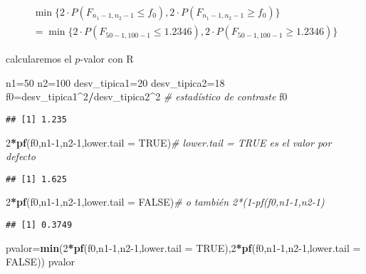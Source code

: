 \documentclass[
]{article}
\newenvironment{Shaded}{\begin{snugshade}}{\end{snugshade}}
\newcommand{\CommentTok}[1]{\textcolor[rgb]{0.56,0.35,0.01}{\textit{#1}}}
\newcommand{\DataTypeTok}[1]{\textcolor[rgb]{0.13,0.29,0.53}{#1}}
\newcommand{\DecValTok}[1]{\textcolor[rgb]{0.00,0.00,0.81}{#1}}
\newcommand{\KeywordTok}[1]{\textcolor[rgb]{0.13,0.29,0.53}{\textbf{#1}}}
\newcommand{\NormalTok}[1]{#1}
\newcommand{\OperatorTok}[1]{\textcolor[rgb]{0.81,0.36,0.00}{\textbf{#1}}}
\newcommand{\OtherTok}[1]{\textcolor[rgb]{0.56,0.35,0.01}{#1}}
\begin{document}
\[
\begin{array}{l}
\min\{2\cdot P(F_{n_1-1,n_2-1}\leq f_0),2\cdot P(F_{n_1-1,n_2-1}\geq f_0)\}\\=\min\{2\cdot P(F_{50-1,100-1}\leq 1.2346),2\cdot P(F_{50-1,100-1}\geq 1.2346)\}
\end{array}
\]

calcularemos el \(p\)-valor con R

\begin{Shaded}
\begin{Highlighting}[]
\NormalTok{n1=}\DecValTok{50}
\NormalTok{n2=}\DecValTok{100}
\NormalTok{desv\_tipica1=}\DecValTok{20}
\NormalTok{desv\_tipica2=}\DecValTok{18}
\NormalTok{f0=desv\_tipica1}\OperatorTok{\^{}}\DecValTok{2}\OperatorTok{/}\NormalTok{desv\_tipica2}\OperatorTok{\^{}}\DecValTok{2} \CommentTok{\# estadístico de contraste}
\NormalTok{f0}
\end{Highlighting}
\end{Shaded}

\begin{verbatim}
## [1] 1.235
\end{verbatim}

\begin{Shaded}
\begin{Highlighting}[]
\DecValTok{2}\OperatorTok{*}\KeywordTok{pf}\NormalTok{(f0,n1}\DecValTok{{-}1}\NormalTok{,n2}\DecValTok{{-}1}\NormalTok{,}\DataTypeTok{lower.tail =} \OtherTok{TRUE}\NormalTok{)}\CommentTok{\# lower.tail = TRUE es el valor por defecto }
\end{Highlighting}
\end{Shaded}

\begin{verbatim}
## [1] 1.625
\end{verbatim}

\begin{Shaded}
\begin{Highlighting}[]
\DecValTok{2}\OperatorTok{*}\KeywordTok{pf}\NormalTok{(f0,n1}\DecValTok{{-}1}\NormalTok{,n2}\DecValTok{{-}1}\NormalTok{,}\DataTypeTok{lower.tail =} \OtherTok{FALSE}\NormalTok{)}\CommentTok{\# o también 2*(1{-}pf(f0,n1{-}1,n2{-}1)  }
\end{Highlighting}
\end{Shaded}

\begin{verbatim}
## [1] 0.3749
\end{verbatim}

\begin{Shaded}
\begin{Highlighting}[]
\NormalTok{pvalor=}\KeywordTok{min}\NormalTok{(}\DecValTok{2}\OperatorTok{*}\KeywordTok{pf}\NormalTok{(f0,n1}\DecValTok{{-}1}\NormalTok{,n2}\DecValTok{{-}1}\NormalTok{,}\DataTypeTok{lower.tail =} \OtherTok{TRUE}\NormalTok{),}\DecValTok{2}\OperatorTok{*}\KeywordTok{pf}\NormalTok{(f0,n1}\DecValTok{{-}1}\NormalTok{,n2}\DecValTok{{-}1}\NormalTok{,}\DataTypeTok{lower.tail =} \OtherTok{FALSE}\NormalTok{))}
\NormalTok{pvalor}
\end{Highlighting}
\end{Shaded}
\end{document}
